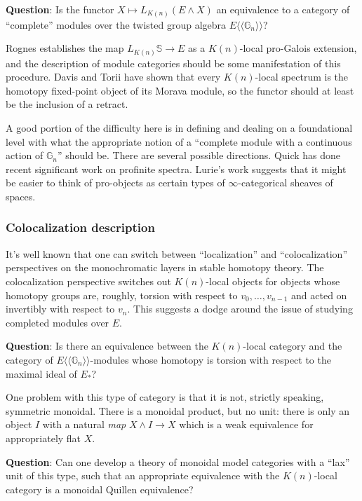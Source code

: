 \documentclass[12pt,titlepage]{article}
\theoremstyle{plain}
\theoremstyle{definition}
\theoremstyle{remark}
\begin{document}
\textbf{Question}: Is the functor $X \mapsto L_{K(n)}(E \wedge X)$ an equivalence to a category of ``{}complete''{} modules over the twisted group algebra $E\langle\!\langle\mathbb{G}_n\rangle\!\rangle$?

Rognes establishes the map $L_{K(n)} \mathbb{S} \to E$ as a $K(n)$-local pro-Galois extension, and the description of module categories should be some manifestation of this procedure. Davis and Torii have shown that every $K(n)$-local spectrum is the homotopy fixed-point object of its Morava module, so the functor should at least be the inclusion of a retract.

A good portion of the difficulty here is in defining and dealing on a foundational level with what the appropriate notion of a ``{}complete module with a continuous action of $\mathbb{G}_n$''{} should be. There are several possible directions. Quick has done recent significant work on profinite spectra. Lurie'{}s work suggests that it might be easier to think of pro-objects as certain types of $\infty$-categorical sheaves of spaces.

\hypertarget{colocalization_description_4}{}\subsubsection{{Colocalization description}}\label{colocalization_description_4}

It'{}s well known that one can switch between ``{}localization''{} and ``{}colocalization''{} perspectives on the monochromatic layers in stable homotopy theory. The colocalization perspective switches out $K(n)$-local objects for objects whose homotopy groups are, roughly, torsion with respect to $v_0,\ldots,v_{n-1}$ and acted on invertibly with respect to $v_n$. This suggests a dodge around the issue of studying completed modules over $E$.

\textbf{Question}: Is there an equivalence between the $K(n)$-local category and the category of $E\langle\!\langle\mathbb{G}_n\rangle\!\rangle$-modules whose homotopy is torsion with respect to the maximal ideal of $E_*$?

One problem with this type of category is that it is not, strictly speaking, symmetric monoidal. There is a monoidal product, but no unit: there is only an object $I$ with a natural \emph{map} $X \wedge I
\to X$ which is a weak equivalence for appropriately flat $X$.

\textbf{Question}: Can one develop a theory of monoidal model categories with a ``{}lax''{} unit of this type, such that an appropriate equivalence with the $K(n)$-local category is a monoidal Quillen equivalence?
\end{document}
